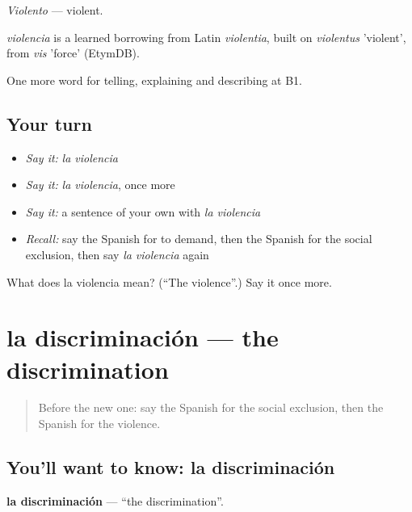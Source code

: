 \emph{Violento} — violent.

\begin{cousinweb}
\emph{violencia} is a learned borrowing from Latin \emph{violentia}, built on \emph{violentus} 'violent', from \emph{vis} 'force' (EtymDB).
\end{cousinweb}

\begin{grammarlens}[title={What you've built}]
One more word for telling, explaining and describing at B1.
\end{grammarlens}

\subsection*{Your turn}
\begin{itemize}
\raggedright
  \item \emph{Say it:} \emph{la violencia}
  \item \emph{Say it:} \emph{la violencia}, once more
  \item \emph{Say it:} a sentence of your own with \emph{la violencia}
  \item \emph{Recall:} say the Spanish for to demand, then the Spanish for the social exclusion, then say \emph{la violencia} again
\end{itemize}

\begin{tcolorbox}[breakable,colback=teal!4,colframe=teal!35!black,title={Before you move on}]
What does la violencia mean? (\textquotedblleft{}The violence\textquotedblright{}.) Say it once more.
\end{tcolorbox}
\section[la discriminación]{la discriminación — the discrimination}

\label{lesson:ES-C605-discriminacion}



\begin{quote}
Before the new one: say the Spanish for the social exclusion, then the Spanish for the violence.
\end{quote}

\subsection*{You'll want to know: la discriminación}
\textbf{la discriminación} — \textquotedblleft{}the discrimination\textquotedblright{}.

